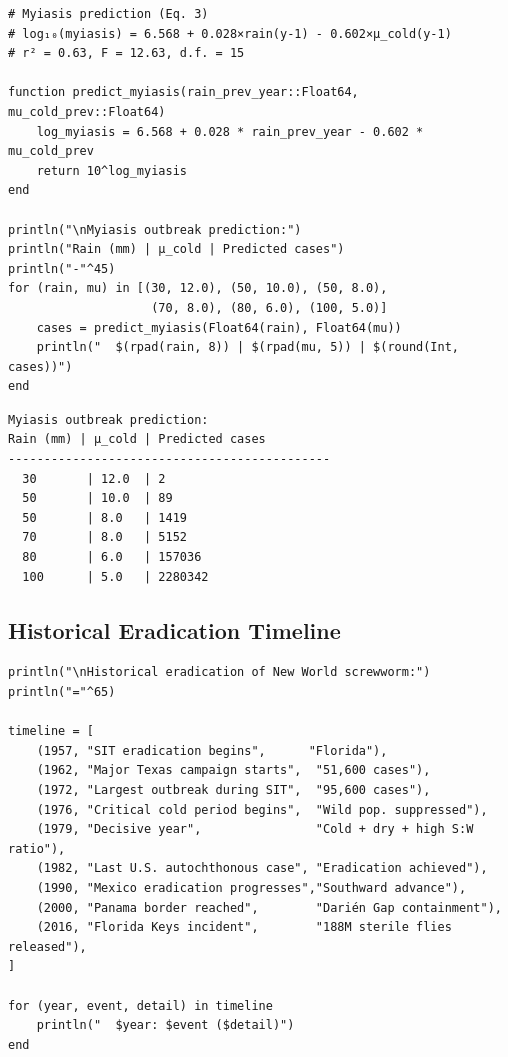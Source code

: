 \begin{verbatim}
# Myiasis prediction (Eq. 3)
# log₁₀(myiasis) = 6.568 + 0.028×rain(y-1) - 0.602×µ_cold(y-1)
# r² = 0.63, F = 12.63, d.f. = 15

function predict_myiasis(rain_prev_year::Float64, mu_cold_prev::Float64)
    log_myiasis = 6.568 + 0.028 * rain_prev_year - 0.602 * mu_cold_prev
    return 10^log_myiasis
end

println("\nMyiasis outbreak prediction:")
println("Rain (mm) | µ_cold | Predicted cases")
println("-"^45)
for (rain, mu) in [(30, 12.0), (50, 10.0), (50, 8.0),
                    (70, 8.0), (80, 6.0), (100, 5.0)]
    cases = predict_myiasis(Float64(rain), Float64(mu))
    println("  $(rpad(rain, 8)) | $(rpad(mu, 5)) | $(round(Int, cases))")
end
\end{verbatim}




\begin{verbatim}
Myiasis outbreak prediction:
Rain (mm) | µ_cold | Predicted cases
---------------------------------------------
  30       | 12.0  | 2
  50       | 10.0  | 89
  50       | 8.0   | 1419
  70       | 8.0   | 5152
  80       | 6.0   | 157036
  100      | 5.0   | 2280342
\end{verbatim}



\subsection{Historical Eradication Timeline}



\label{18311571989237453776}{}



\begin{verbatim}
println("\nHistorical eradication of New World screwworm:")
println("="^65)

timeline = [
    (1957, "SIT eradication begins",      "Florida"),
    (1962, "Major Texas campaign starts",  "51,600 cases"),
    (1972, "Largest outbreak during SIT",  "95,600 cases"),
    (1976, "Critical cold period begins",  "Wild pop. suppressed"),
    (1979, "Decisive year",                "Cold + dry + high S:W ratio"),
    (1982, "Last U.S. autochthonous case", "Eradication achieved"),
    (1990, "Mexico eradication progresses","Southward advance"),
    (2000, "Panama border reached",        "Darién Gap containment"),
    (2016, "Florida Keys incident",        "188M sterile flies released"),
]

for (year, event, detail) in timeline
    println("  $year: $event ($detail)")
end
\end{verbatim}




